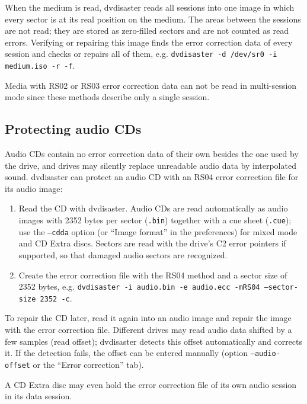When the medium is read, dvdisaster reads all sessions into one image in which every sector is at
its real position on the medium. The areas between the sessions are not read; they are stored as
zero-filled sectors and are not counted as read errors. Verifying or repairing this image
finds the error correction data of every session and checks or repairs all of them,
e.g. {\tt dvdisaster -d /dev/sr0 -i medium.iso -r -f}.

\smallskip

Media with RS02 or RS03 error correction data can not be read in multi-session mode since
these methods describe only a single session.

\newpage
\subsection{Protecting audio CDs}
\label{howto-audio}

Audio CDs contain no error correction data of their own besides the one used by the drive, and
drives may silently replace unreadable audio data by interpolated sound. dvdisaster can protect
an audio CD with an RS04 error correction file for its audio image:

\begin{enumerate}
\item Read the CD with dvdisaster. Audio CDs are read automatically as audio images with
  2352 bytes per sector ({\tt .bin}) together with a cue sheet ({\tt .cue});
  use the {\tt --cdda} option (or ``Image format'' in the preferences)
  for mixed mode and CD Extra discs. Sectors are read with the drive's C2 error pointers if supported, so
  that damaged audio sectors are recognized.
\item Create the error correction file with the RS04 method and a sector size of 2352 bytes,
  e.g. {\tt dvdisaster -i audio.bin -e audio.ecc -mRS04 --sector-size 2352 -c}.
\end{enumerate}

To repair the CD later, read it again into an audio image and repair the image with the error correction file.
Different drives may read audio data shifted by a few samples (read offset); dvdisaster detects this offset
automatically and corrects it. If the detection fails, the offset can be entered manually
(option {\tt --audio-offset} or the ``Error correction'' tab).

\smallskip

A CD Extra disc may even hold the error correction file of its own audio session in its data session.

